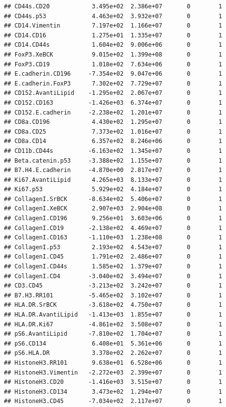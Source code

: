 \documentclass[a4paper]{article}\usepackage[]{graphicx}\usepackage[]{color}
\makeatletter
\newenvironment{kframe}{%
 \def\at@end@of@kframe{}%
 \ifinner\ifhmode%
  \def\at@end@of@kframe{\end{minipage}}%
  \begin{minipage}{\columnwidth}%
 \fi\fi%
 \def\FrameCommand##1{\hskip\@totalleftmargin \hskip-\fboxsep
 \colorbox{shadecolor}{##1}\hskip-\fboxsep
     \hskip-\linewidth \hskip-\@totalleftmargin \hskip\columnwidth}%
 \MakeFramed {\advance\hsize-\width
   \@totalleftmargin\z@ \linewidth\hsize
   \@setminipage}}%
 {\par\unskip\endMakeFramed%
 \at@end@of@kframe}
\newenvironment{knitrout}{}{} %
\makeatother
\begin{document}
\begin{knitrout}
\begin{kframe}
\begin{verbatim}
## CD44s.CD20            3.495e+02  2.386e+07       0        1
## CD44s.p53             4.463e+02  3.932e+07       0        1
## CD14.Vimentin         7.197e+02  1.166e+07       0        1
## CD14.CD16             1.275e+01  1.335e+07       0        1
## CD14.CD44s            1.604e+02  9.006e+06       0        1
## FoxP3.XeBCK           9.015e+02  1.399e+08       0        1
## FoxP3.CD19            1.018e+02  7.634e+06       0        1
## E.cadherin.CD196     -7.354e+02  9.047e+06       0        1
## E.cadherin.FoxP3      7.302e+02  7.729e+07       0        1
## CD152.AvantiLipid    -1.295e+02  2.067e+07       0        1
## CD152.CD163          -1.426e+03  6.374e+07       0        1
## CD152.E.cadherin     -2.238e+02  1.201e+07       0        1
## CD8a.CD196            4.430e+02  1.295e+07       0        1
## CD8a.CD25             7.373e+02  1.016e+07       0        1
## CD8a.CD14             6.357e+02  8.246e+06       0        1
## CD11b.CD44s          -6.163e+02  1.345e+07       0        1
## Beta.catenin.p53     -3.388e+02  1.155e+07       0        1
## B7.H4.E.cadherin     -4.870e+00  2.817e+07       0        1
## Ki67.AvantiLipid      4.265e+03  8.133e+07       0        1
## Ki67.p53              5.929e+02  4.184e+07       0        1
## CollagenI.SrBCK      -8.634e+02  5.406e+07       0        1
## CollagenI.XeBCK       2.907e+03  2.904e+08       0        1
## CollagenI.CD196       9.256e+01  3.603e+06       0        1
## CollagenI.CD19       -2.138e+02  4.469e+07       0        1
## CollagenI.CD163      -1.110e+03  1.238e+08       0        1
## CollagenI.p53         2.193e+02  4.543e+07       0        1
## CollagenI.CD45        1.791e+02  2.486e+07       0        1
## CollagenI.CD44s       1.585e+02  1.379e+07       0        1
## CollagenI.CD4        -3.040e+02  3.494e+07       0        1
## CD3.CD45             -3.213e+02  3.242e+07       0        1
## B7.H3.RR101          -5.465e+02  3.102e+07       0        1
## HLA.DR.SrBCK         -3.618e+02  4.750e+07       0        1
## HLA.DR.AvantiLipid   -1.413e+03  1.855e+07       0        1
## HLA.DR.Ki67          -4.861e+02  3.508e+07       0        1
## pS6.AvantiLipid      -7.810e+02  1.704e+07       0        1
## pS6.CD134             6.408e+01  5.361e+06       0        1
## pS6.HLA.DR            3.378e+02  2.262e+07       0        1
## HistoneH3.RR101       9.638e+01  6.528e+06       0        1
## HistoneH3.Vimentin   -2.272e+03  2.399e+07       0        1
## HistoneH3.CD20       -1.416e+03  3.515e+07       0        1
## HistoneH3.CD134       3.473e+02  1.294e+07       0        1
## HistoneH3.CD45       -7.034e+02  2.117e+07       0        1

\end{verbatim}
\end{kframe}
\end{knitrout}
\end{document}
